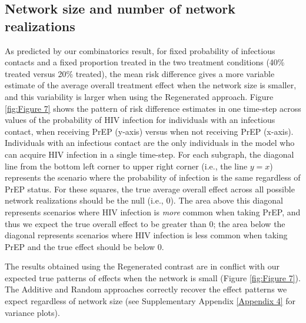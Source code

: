 \documentclass{article}
\theoremstyle{definition}
\begin{document}
\subsection{Network size and number of network realizations}
As predicted by our combinatorics result, for fixed probability of infectious contacts and a fixed proportion treated in the two treatment conditions (40\% treated versus 20\% treated), the mean risk difference gives a more variable estimate of the average overall treatment effect when the network size is smaller, and this variability is larger when using the Regenerated approach. Figure \ref{fig:Figure 7} shows the pattern of risk difference estimates in one time-step across values of the probability of HIV infection for individuals with an infectious contact, when receiving PrEP (y-axis) versus when not receiving PrEP (x-axis). Individuals with an infectious contact are the only individuals in the model who can acquire HIV infection in a single time-step. For each subgraph, the diagonal line from the bottom left corner to upper right corner (i.e., the line $y=x$) represents the scenario where the probability of infection is the same regardless of PrEP status. For these squares, the true average overall effect across all possible network realizations should be the null (i.e., 0). The area above this diagonal represents scenarios where HIV infection is \textit{more} common when taking PrEP, and thus we expect the true overall effect to be greater than 0; the area below the diagonal represents scenarios where HIV infection is less common when taking PrEP and the true effect should be below 0. 

The results obtained using the Regenerated contrast are in conflict with our expected true patterns of effects when the network is small (Figure \ref{fig:Figure 7}). The Additive and Random approaches correctly recover the effect patterns we expect regardless of network size (see Supplementary Appendix \ref{Appendix 4} for variance plots). 
\end{document}
